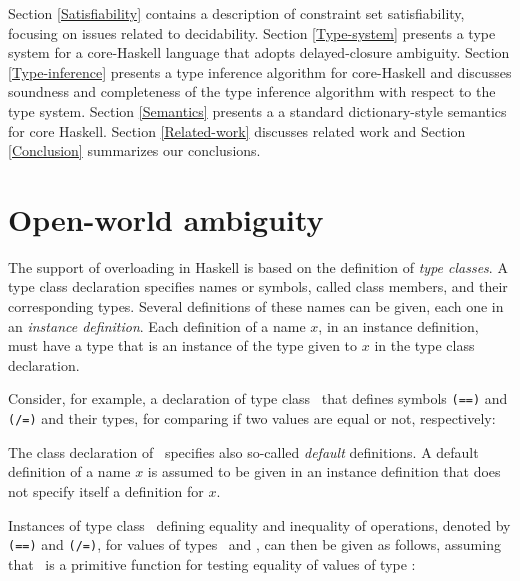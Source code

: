 \documentclass[review]{elsarticle}
\begin{document}
Section \ref{Satisfiability} contains a description of constraint set
satisfiability, focusing on issues related to decidability. Section
\ref{Type-system} presents a type system for a core-Haskell language
that adopts delayed-closure ambiguity.  Section \ref{Type-inference}
presents a type inference algorithm for core-Haskell and discusses
soundness and completeness of the type inference algorithm with
respect to the type system. Section \ref{Semantics} presents a a
standard dictionary-style semantics for core Haskell. Section
\ref{Related-work} discusses related work and Section \ref{Conclusion}
summarizes our conclusions.

\section{Open-world ambiguity}
\label{Haskell-ambiguity}

The support of overloading in Haskell is based on the definition of
{\em type classes\/}. A type class declaration specifies names or
symbols, called class members, and their corresponding types. Several
definitions of these names can be given, each one in an {\em instance
  definition\/}. Each definition of a name $x$, in an instance
definition, must have a type that is an instance of the type given to
$x$ in the type class declaration.

Consider, for example, a declaration of type class \Eq\ that defines
symbols {\tt (==)} and {\tt (/=)} and their types, for comparing if
two values are equal or not, respectively:


The class declaration of \Eq\ specifies also so-called {\em default\/}
definitions. A default definition of a name $x$ is assumed to be given
in an instance definition that does not specify itself a definition
for $x$.

Instances of type class \Eq\ defining equality and inequality of
operations, denoted by {\tt (==)} and {\tt (/=)}, for values of types
\Int\ and \Bool, can then be given as follows, assuming that
\primEqInt\ is a primitive function for testing equality of values of
type \Int:
\end{document}
